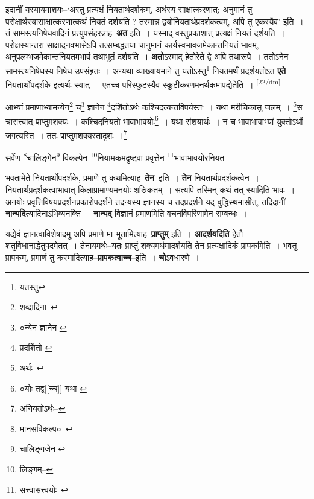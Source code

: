 \documentclass[article,12pt,a4paper]{memoir}
\begin{document}
	  \pstart इदानीं यस्यायमाशयः--‘अस्तु प्रत्यक्षं नियतार्थदर्शकम्, अर्थस्य साक्षात्करणात्; अनुमानं तु परोक्षार्थस्यासाक्षात्करणात्कथं नियतं दर्शयति ? तस्मान्न द्वयोर्नियतार्थप्रदर्शकत्वम्, अपि तु एकस्यैव’ इति । तं सामस्त्यनिषेधवादिनं प्रत्युपसंहरन्नाह--\textbf{अत} इति । यस्माद् वस्तुप्रकाशात् प्रत्यक्षं नियतं दर्शयति । परोक्षस्यान्तरा साक्षादनवभासेऽपि तत्सम्बद्धतया चानुमानं कार्यस्वभावजमेकान्तनियतं भावम्, अनुपलम्भजमेकान्तनियतमभावं तथाभूतं दर्शयति । \textbf{अतो}ऽस्माद् हेतोरेते द्वे अपि तथारूपे । ततोऽनेन सामस्त्यनिषेधस्य निषेध उपसंहृतः । अन्यथा व्याख्यायमाने तु यतोऽस्तु\footnote{यतस्तु} नियतमर्थं प्रदर्शयतोऽत \textbf{एते} नियतार्थोपदर्शके इत्यर्थः स्यात् । एतच्च परिस्फुटस्यैव स्कुटीकरणमनर्थकमापद्येतेति ।
	\pend
      \leavevmode\textsuperscript{\rmlatinfont\tiny [22/dm]}

	  \pstart आभ्यां प्रमाणाभ्यामन्येन\footnote{शब्दादिना--\cite{dp-msD-n}} च\footnote{०न्येन ज्ञानेन \cite{dp-edE} \cite{dp-edN}} ज्ञानेन \footnote{प्रदर्शितो \cite{dp-msA} \cite{dp-msC} \cite{dp-edP} \cite{dp-edN}}दर्शितोऽर्थः कश्चिदत्यन्तविपर्यस्तः । यथा मरीचिकासु जलम् । \footnote{अर्थः--\cite{dp-msD-n}}स चासत्त्वात् प्राप्तुमशक्यः । कश्चिदनियतो भावाभावयोः\footnote{०योः तद्व[[च्च]] यथा \cite{dp-msC}} । यथा संशयार्थः । न च भावाभावाभ्यां युक्तोऽर्थो जगत्यस्ति । ततः प्राप्तुमशक्यस्तादृशः ।\footnote{अनियतोऽर्थः--\cite{dp-msD-n}}
	\pend
       

	  \pstart सर्वेण \footnote{मानसविकल्प०--\cite{dp-msD-n}}चालिङ्गेन\footnote{चालिङ्गजेन \cite{dp-msC} \cite{dp-msD} \cite{dp-msA} \cite{dp-msB} \cite{dp-edP} \cite{dp-edH} \cite{dp-edE} \cite{dp-edN}} विकल्पेन \footnote{लिङ्गम्--\cite{dp-msD-n}}नियामकमदृष्ट्वा प्रवृत्तेन \footnote{सत्त्वासत्त्वयोः--\cite{dp-msD-n}}भावाभावयोरनियत
	\pend
      

	  \pstart भवतामेते नियतार्थोपदर्शके, प्रमाणे तु कथमित्याह--\textbf{तेन}--इति । \textbf{तेन} नियतार्थप्रदर्शकत्वेन । नियतार्थप्रदर्शकत्वाभावात् किलाप्रामाण्यमनयोः शङिकतम् । सत्यपि तस्मिन् कथं तत् स्यादिति भावः । अनयोः प्रवृत्तिविषयप्रदर्शनप्रकारोपदर्शने तदन्यस्य ज्ञानस्य च तदप्रदर्शने यद् बुद्धिस्थमासीत्, तदिदानीं \textbf{नान्यदि}त्यादिनाऽभिव्यनक्ति । \textbf{नान्यद्} विज्ञानं प्रमाणमिति वचनविपरिणामेन सम्बन्धः ।
	\pend
      

	  \pstart यद्येवं ज्ञानत्वाविशेषादमू अपि प्रमाणे मा भूतामित्याह--\textbf{प्राप्तुम्} इति । \textbf{आदर्शयदिति} हेतौ शतुर्विधानाद्धेतुपदमेतत् । तेनायमर्थः--यतः प्राप्तुं शक्यमर्थमादर्शयति तेन प्रत्यक्षादिकं प्रापकमिति । भवतु प्रापकम्, प्रमाणं तु कस्मादित्याह--\textbf{प्रापकत्वाच्च}--इति । \textbf{चो}ऽवधारणे ।
	\pend
      
\end{document}
